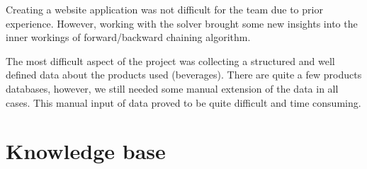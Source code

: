 \documentclass[11pt,a4paper]{article}
\begin{document}
Creating a website application was not difficult for the team due to prior experience. However, working with the solver brought some new insights into the inner workings of forward/backward chaining algorithm.

The most difficult aspect of the project was collecting a structured and well defined data about the products used (beverages). There are quite a few products databases, however, we still needed some manual extension of the data in all cases. This manual input of data proved to be quite difficult and time consuming. 

\clearpage
\appendix

\section{Knowledge base}
\label{app:kb}

\end{document}
